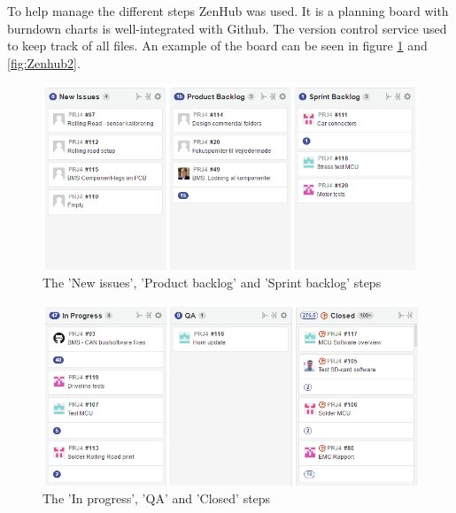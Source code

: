 To help manage the different steps ZenHub\cite{Zenhub} was used. It is a planning board with burndown charts is well-integrated with Github\cite{Github}. The version control service used to keep track of all files. An example of the board can be seen in figure \ref{fig:Zenhub1} and \vref{fig:Zenhub2}.

\begin{figure}
	\centering
	\includegraphics[width=0.7\linewidth]{SubPages/Images/Zenhub1}
	\caption{The 'New issues', 'Product backlog' and 'Sprint backlog' steps}
	\label{fig:Zenhub1}
\end{figure}

\begin{figure}
	\centering
	\includegraphics[width=0.7\linewidth]{SubPages/Images/Zenhub2}
	\caption{The 'In progress', 'QA' and 'Closed' steps}
	\label{fig:Zenhub2}
\end{figure}
